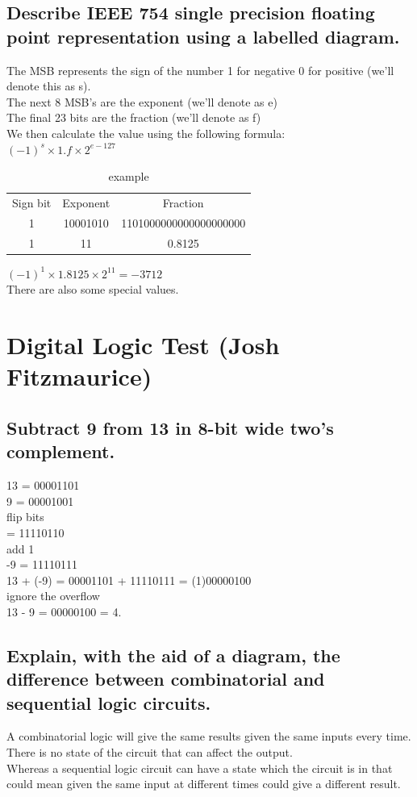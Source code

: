 \documentclass{article}
\begin{document}
\subsection{Describe IEEE 754 single precision floating point representation using a labelled diagram.}
The MSB represents the sign of the number 1 for negative 0 for positive (we'll denote this as s).\\
The next 8 MSB's are the exponent (we'll denote as e)\\
The final 23 bits are the fraction (we'll denote as f)\\
We then calculate the value using the following formula:\\
$(-1)^s \times 1.f \times 2^{e - 127}$\\
\begin{table}[h]
    \centering
    \begin{tabular}{|c|c|c|}
        Sign bit & Exponent & Fraction \\
        1 & 10001010 & 1101000000000000000000\\
        \hline
        1 & 11 & 0.8125
    \end{tabular}
    \caption{example}
    \label{tab:my_label}
\end{table}

$(-1)^1 \times 1.8125 \times 2^{11} = -3712$\\
There are also some special values.



\newpage
\section{Digital Logic Test (Josh Fitzmaurice)}
\subsection{Subtract 9 from 13 in 8-bit wide two’s complement.}
13 = 00001101\\
9 = 00001001\\
flip bits\\
  = 11110110\\
add 1\\
-9 = 11110111\\
13 + (-9) = 00001101 + 11110111 = (1)00000100\\
ignore the overflow\\
13 - 9 = 00000100 = 4.

\subsection{Explain, with the aid of a diagram, the difference between combinatorial and sequential logic circuits.}
A combinatorial logic will give the same results given the same inputs every time. There is no state of the circuit that can affect the output.\\
Whereas a sequential logic circuit can have a state which the circuit is in that could mean given the same input at different times could give a different result.\\
\end{document}
